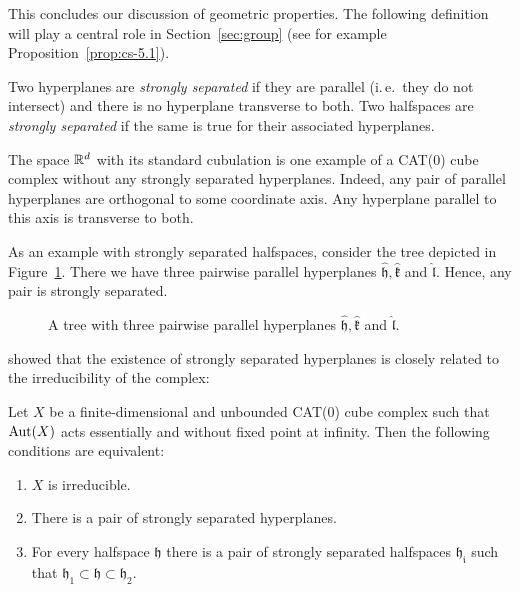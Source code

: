 This concludes our discussion of geometric properties. The following definition will play a central role in Section~\ref{sec:group} (see for example Proposition~\ref{prop:cs-5.1}).

\begin{defin}
  \label{defin:strong-sep}
  Two hyperplanes are \emph{strongly separated} if they are parallel (i.\,e.\ they do not intersect) and there is no hyperplane transverse to both. Two halfspaces are \emph{strongly separated} if the same is true for their associated hyperplanes.
\end{defin}

\begin{bsp}
  The space \(\mathbb{R}^d\) with its standard cubulation is one example of a CAT(0) cube complex without any strongly separated hyperplanes. Indeed, any pair of parallel hyperplanes are orthogonal to some coordinate axis. Any hyperplane parallel to this axis is transverse to both.

  As an example with strongly separated halfspaces, consider the tree depicted in Figure~\ref{fig:str-sep}. There we have three pairwise parallel hyperplanes \(\mathfrak{\hat h}, \mathfrak{\hat k}\) and \(\mathfrak{\hat l}\). Hence, any pair is strongly separated.

  \begin{figure}[htbp]
    \centering
    
    \caption{A tree with three pairwise parallel hyperplanes \(\mathfrak{\hat h}, \mathfrak{\hat k}\) and \(\mathfrak{\hat l}\).}
    \label{fig:str-sep}
  \end{figure}
\end{bsp}

\textcite{Caprace2010} showed that the existence of strongly separated hyperplanes is closely related to the irreducibility of the complex:
\begin{prop}
  \label{prop:cs-5.1}
  Let \(X\) be a finite-dimensional and unbounded CAT(0) cube complex such that \(\operatorname{Aut}(X)\) acts essentially and without fixed point at infinity. Then the following conditions are equivalent:
  \begin{enumerate}
  \item \(X\) is irreducible.
  \item There is a pair of strongly separated hyperplanes.
  \item For every halfspace \(\mathfrak{h}\) there is a pair of strongly separated halfspaces \(\mathfrak{h_i}\) such that \(\mathfrak{h}_1 \subset \mathfrak{h} \subset \mathfrak{h}_2\).
  \end{enumerate}
\end{prop}

